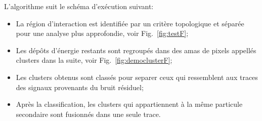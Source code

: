 L'algorithme suit le sch\'ema d'ex\'ecution suivant:
\begin{itemize}
	\item La région d'interaction est identifiée par un critère topologique et séparée pour une analyse plus approfondie, voir Fig.~\ref{fig:testF};
	\item Les dépôts d'énergie restants sont regroupés dans des amas de pixels appellés  clusters dans la suite, voir Fig.~\ref{fig:democlusterF};
	\item Les clusters obtenus sont classés pour separer ceux qui ressemblent aux traces des signaux provenants du bruit résiduel; 
	\item Après la classification, les clusters qui appartiennent à la même particule secondaire   sont fusionnés dans une seule trace.
	
\end{itemize}
